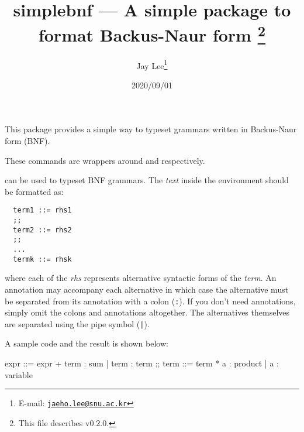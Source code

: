 \documentclass[a4paper]{article}
\title{%
  \textsf{simplebnf} --- A simple package to format Backus-Naur form%
  \footnote{This file describes v0.2.0.}}
\author{Jay Lee\footnote{E-mail: %
  \href{mailto:jaeho.lee@snu.ac.kr}{\texttt{jaeho.lee@snu.ac.kr}}}}
\date{2020/09/01}
\begin{document}
\maketitle

This package provides a simple way to typeset grammars written in Backus-Naur form (BNF).

\begin{presentcommand}
   
\end{presentcommand}
These commands are wrappers around  and  respectively.

\begin{presentcommand}
\end{presentcommand}
can be used to typeset BNF grammars. The \textit{text} inside the environment should be formatted as:
\begin{verbatim}
  term1 ::= rhs1
  ;;
  term2 ::= rhs2
  ;;
  ...
  termk ::= rhsk
\end{verbatim}
where each of the \textit{rhs} represents alternative syntactic forms of the \textit{term}. An annotation may accompany each alternative in which case the alternative must be separated from its annotation with a colon (\verb/:/). If you don't need annotations, simply omit the colons and annotations altogether. The alternatives themselves are separated using the pipe symbol (\verb/|/).

A sample code and the result is shown below:
\begin{exampleside}
  \begin{bnfgrammar}
    expr ::=
      expr + term : sum
    | term        : term
    ;;
    term ::=
      term * a : product
    | a        : variable
  \end{bnfgrammar}
\end{exampleside}
\end{document}
